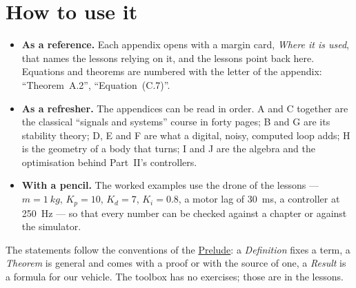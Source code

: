 \section*{How to use it}

\begin{itemize}
  \item \textbf{As a reference.} Each appendix opens with a margin card, \emph{Where it is used}, that names the lessons relying on it, and the lessons point back here. Equations and theorems are numbered with the letter of the appendix: \enquote{Theorem~A.2}, \enquote{Equation~(C.7)}.
  \item \textbf{As a refresher.} The appendices can be read in order. A and C together are the classical \enquote{signals and systems} course in forty pages; B and G are its stability theory; D, E and F are what a digital, noisy, computed loop adds; H is the geometry of a body that turns; I and J are the algebra and the optimisation behind Part~II's controllers.
  \item \textbf{With a pencil.} The worked examples use the drone of the lessons — $m = \SI{1}{kg}$, $K_p = 10$, $K_d = 7$, $K_i = 0.8$, a motor lag of \SI{30}{ms}, a controller at \SI{250}{Hz} — so that every number can be checked against a chapter or against the simulator.
\end{itemize}

The statements follow the conventions of the \hyperref[sec:notation]{Prelude}: a \emph{Definition} fixes a term, a \emph{Theorem} is general and comes with a proof or with the source of one, a \emph{Result} is a formula for our vehicle. The toolbox has no exercises; those are in the lessons.











